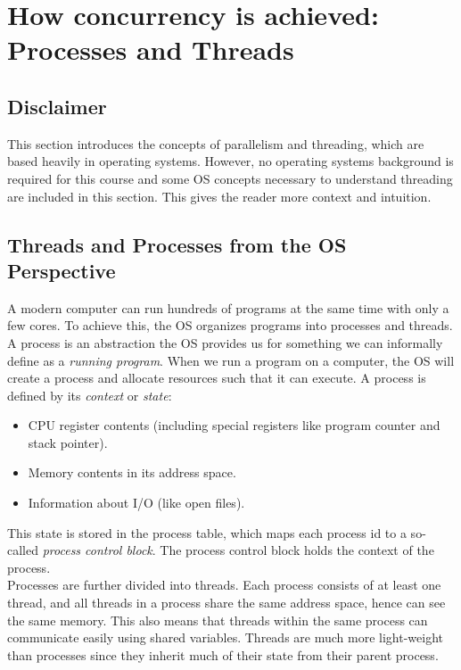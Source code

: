 \documentclass[main]{subfiles}
\begin{document}
\section{How concurrency is achieved: Processes and Threads}
\subsection{Disclaimer}
This section introduces the concepts of parallelism and threading, which are based heavily in operating systems. However, no operating systems background is required for this course and some OS concepts necessary to understand threading are included in this section. This gives the reader more context and intuition. %


\subsection{Threads and Processes from the OS Perspective}
A modern computer can run hundreds of programs at the same time with only a few cores. To achieve this, the OS organizes programs into processes and threads.\\
A process is an abstraction the OS provides us for something we can informally define as a \textit{running program}. When we run a program on a computer, the OS will create a process and allocate resources such that it can execute. A process is defined by its \textit{context} or \textit{state}:
\begin{itemize}
    \item CPU register contents (including special registers like program counter and stack pointer).
    \item Memory contents in its address space.
    \item Information about I/O (like open files).
\end{itemize}
This state is stored in the process table, which maps each process id to a so-called \textit{process control block}. The process control block holds the context of the process. \\[3mm]
Processes are further divided into threads. Each process consists of at least one thread, and all threads in a process share the same address space, hence can see the same memory. This also means that threads within the same process can communicate easily using shared variables. Threads are much more light-weight than processes since they inherit much of their state from their parent process.
\end{document}
